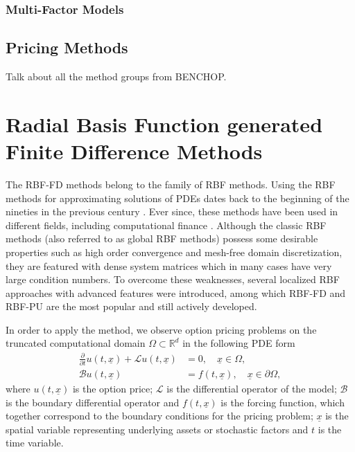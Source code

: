 \documentclass{UUThesisTemplate}
\begin{document}
\subsection{Multi-Factor Models}

%
\section{Pricing Methods}
\label{sec:methods}
Talk about all the method groups from BENCHOP.
%
%
\chapter{Radial Basis Function generated Finite Difference Methods}
\label{ch:rbffd}
The RBF-FD methods belong to the family of RBF methods. Using the RBF methods for approximating solutions of PDEs dates back to the beginning of the nineties in the previous century \cite{kansa1990multiquadrics2, kansa1990multiquadrics1}. Ever since, these methods have been used in different fields, including computational finance \cite{fasshauer2004using, hon1999radial, pettersson2008improved}. Although the classic RBF methods (also referred to as global RBF methods) possess some desirable properties such as high order convergence and mesh-free domain discretization, they are featured with dense system matrices which in many cases have very large condition numbers. To overcome these weaknesses, several localized RBF approaches with advanced features were introduced, among which RBF-FD \cite{tolstykh2000using, wright2006scattered} and RBF-PU \cite{wendland2002fast} are the most popular and still actively developed.
\par
In order to apply the method, we observe option pricing problems on the truncated computational domain $\Omega\subset \mathbb{R}^{d}$ in the following PDE form
\begin{align}
\frac{\partial}{\partial t}u(t,\underline{x}) + \mathcal{L}u(t,\underline{x}) &= 0, \quad \underline{x} \in \Omega, \label{eqPDE} \\
\mathcal{B}u(t,\underline{x}) &= f(t,\underline{x}), \quad \underline{x} \in \partial \Omega, \label{eqBC}
\end{align}
where $u(t,\underline{x})$ is the option price; $\mathcal{L}$ is the differential operator of the model; $\mathcal{B}$ is the boundary differential operator and $f(t,\underline{x})$ is the forcing function, which together correspond to the boundary conditions for the pricing problem; $\underline{x}$ is the spatial variable representing underlying assets or stochastic factors and $t$ is the time variable.
\end{document}
